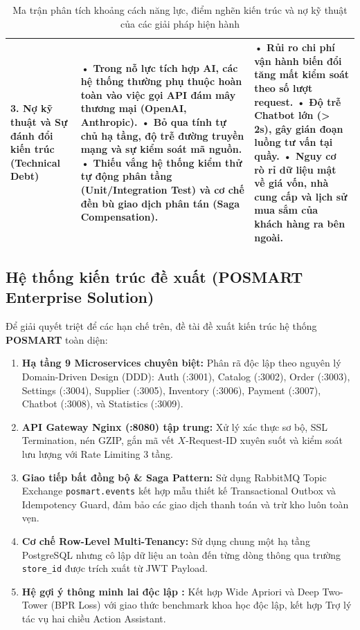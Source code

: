 \documentclass[12pt,a4paper]{report}
\begin{document}
\begin{table}[htbp]
\begin{tabularx}{\textwidth}{|p{3.5cm}|X|X|}
\textbf{3. Nợ kỹ thuật và Sự đánh đổi kiến trúc (Technical Debt)} & 
• Trong nỗ lực tích hợp AI, các hệ thống thường phụ thuộc hoàn toàn vào việc gọi API đám mây thương mại (OpenAI, Anthropic).\newline
• Bỏ qua tính tự chủ hạ tầng, độ trễ đường truyền mạng và sự kiểm soát mã nguồn.\newline
• Thiếu vắng hệ thống kiểm thử tự động phân tầng (Unit/Integration Test) và cơ chế đền bù giao dịch phân tán (Saga Compensation). & 
• Rủi ro chi phí vận hành biến đổi tăng mất kiểm soát theo số lượt request.\newline
• Độ trễ Chatbot lớn (> 2s), gây gián đoạn luồng tư vấn tại quầy.\newline
• Nguy cơ rò rỉ dữ liệu mật về giá vốn, nhà cung cấp và lịch sử mua sắm của khách hàng ra bên ngoài. \\ \hline
\end{tabularx}
\caption{Ma trận phân tích khoảng cách năng lực, điểm nghẽn kiến trúc và nợ kỹ thuật của các giải pháp hiện hành}
\label{tab:matrix-debt}
\end{table}

\subsection{Hệ thống kiến trúc đề xuất (POSMART Enterprise Solution)}
Để giải quyết triệt để các hạn chế trên, đề tài đề xuất kiến trúc hệ thống \textbf{POSMART} toàn diện:
\begin{enumerate}
    \item \textbf{Hạ tầng 9 Microservices chuyên biệt:} Phân rã độc lập theo nguyên lý Domain-Driven Design (DDD): Auth (:3001), Catalog (:3002), Order (:3003), Settings (:3004), Supplier (:3005), Inventory (:3006), Payment (:3007), Chatbot (:3008), và Statistics (:3009).
    \item \textbf{API Gateway Nginx (:8080) tập trung:} Xử lý xác thực sơ bộ, SSL Termination, nén GZIP, gắn mã vết $X\text{-Request-ID}$ xuyên suốt và kiểm soát lưu lượng với Rate Limiting 3 tầng.
    \item \textbf{Giao tiếp bất đồng bộ \& Saga Pattern:} Sử dụng RabbitMQ Topic Exchange \texttt{posmart.events} kết hợp mẫu thiết kế Transactional Outbox và Idempotency Guard, đảm bảo các giao dịch thanh toán và trừ kho luôn toàn vẹn.
    \item \textbf{Cơ chế Row-Level Multi-Tenancy:} Sử dụng chung một hạ tầng PostgreSQL nhưng cô lập dữ liệu an toàn đến từng dòng thông qua trường \texttt{store\_id} được trích xuất từ JWT Payload.
    \item \textbf{Hệ gợi ý thông minh lai độc lập :} Kết hợp Wide Apriori và Deep Two-Tower (BPR Loss) với giao thức benchmark khoa học độc lập, kết hợp Trợ lý tác vụ hai chiều Action Assistant.
\end{enumerate}
\end{document}
